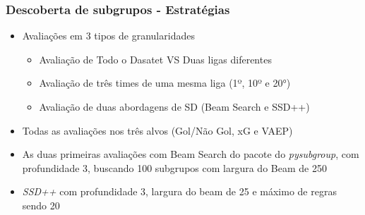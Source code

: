 \documentclass{beamer}
\begin{document}
\begin{frame}
\frametitle{Descoberta de subgrupos - Estratégias}
\begin{itemize}
    \item Avaliações em 3 tipos de granularidades
    \begin{itemize}
        \item Avaliação de Todo o Dasatet VS Duas ligas diferentes
        \item Avaliação de três times de uma mesma liga (1º, 10º e 20°) 
        \item Avaliação de duas abordagens de SD (Beam Search e SSD++)
    \end{itemize}
\end{itemize}
\begin{itemize}
    \item Todas as avaliações nos três alvos (Gol/Não Gol, xG e VAEP)
    \item As duas primeiras avaliações com Beam Search do pacote do \textit{pysubgroup}, 
    com profundidade 3, buscando 100 subgrupos com largura do Beam de 250
    \item \textit{SSD++} com profundidade 3, largura do beam de 25 e máximo de regras sendo 20
\end{itemize}
\end{frame}
\end{document}
